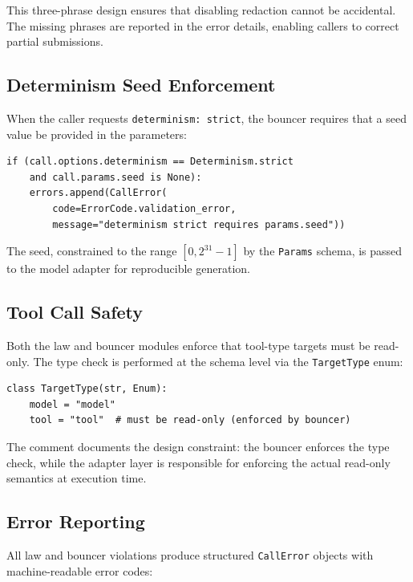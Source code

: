 \documentclass[11pt,a4paper]{article}
\theoremstyle{plain}
\theoremstyle{definition}
\begin{document}
This three-phrase design ensures that disabling redaction cannot be accidental.
The missing phrases are reported in the error details, enabling callers to
correct partial submissions.

\subsection{Determinism Seed Enforcement}

When the caller requests \texttt{determinism: strict}, the bouncer requires
that a seed value be provided in the parameters:

\begin{lstlisting}[style=pythonstyle, caption={Determinism enforcement from \texttt{bouncer.py}}]
if (call.options.determinism == Determinism.strict
    and call.params.seed is None):
    errors.append(CallError(
        code=ErrorCode.validation_error,
        message="determinism strict requires params.seed"))
\end{lstlisting}

The seed, constrained to the range $[0, 2^{31}-1]$ by the \texttt{Params}
schema, is passed to the model adapter for reproducible generation.

\subsection{Tool Call Safety}

Both the law and bouncer modules enforce that tool-type targets must be
read-only. The type check is performed at the schema level via the
\texttt{TargetType} enum:

\begin{lstlisting}[style=pythonstyle, caption={TargetType enforcement from \texttt{schemas.py}}]
class TargetType(str, Enum):
    model = "model"
    tool = "tool"  # must be read-only (enforced by bouncer)
\end{lstlisting}

The comment documents the design constraint: the bouncer enforces the type check,
while the adapter layer is responsible for enforcing the actual read-only
semantics at execution time.

\subsection{Error Reporting}

All law and bouncer violations produce structured \texttt{CallError} objects
with machine-readable error codes:
\end{document}

